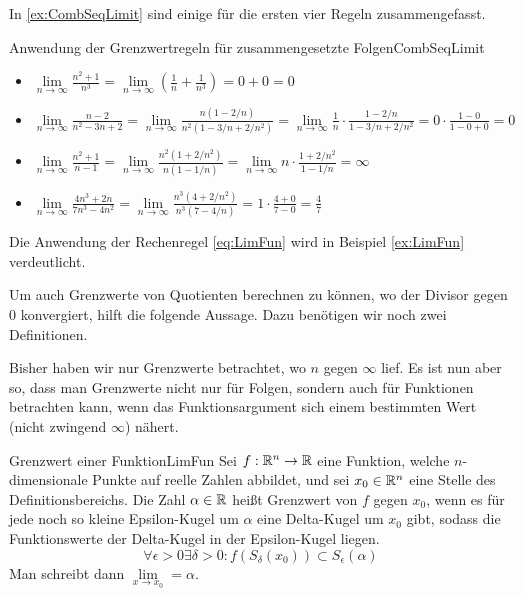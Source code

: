 In \ref{ex:CombSeqLimit} sind einige für die ersten vier Regeln zusammengefasst.

\begin{example}{Anwendung der Grenzwertregeln für zusammengesetzte Folgen}{CombSeqLimit}
    \begin{itemize}
        \item $\lim\limits_{n\to\infty} \frac{n^2+1}{n^3} = \lim\limits_{n\to\infty} \left(\frac{1}{n} + \frac{1}{n^3}\right) = 0 + 0 = 0$ \\
        \item $\lim\limits_{n\to\infty} \frac{n-2}{n^2-3n+2} = \lim\limits_{n\to\infty} \frac{n(1-2/n)}{n^2(1-3/n+2/n^2)} = \lim\limits_{n\to\infty} \frac{1}{n} \cdot \frac{1-2/n}{1-3/n+2/n^2} = 0 \cdot \frac{1-0}{1-0+0} = 0$ \\
        \item $\lim\limits_{n\to\infty} \frac{n^2+1}{n-1} = \lim\limits_{n\to\infty} \frac{n^2(1+2/n^2)}{n(1-1/n)} = \lim\limits_{n\to\infty} n \cdot \frac{1+2/n^2}{1-1/n} = \infty $
        \item $\lim\limits_{n\to\infty} \frac{4n^3+2n}{7n^3-4n^2} = \lim\limits_{n\to\infty} \frac{n^3(4+2/n^2)}{n^3(7-4/n)} = 1 \cdot \frac{4+0}{7-0} = \frac{4}{7}$
    \end{itemize}
\end{example}

Die Anwendung der Rechenregel \ref{eq:LimFun} wird in Beispiel \ref{ex:LimFun} verdeutlicht.

Um auch Grenzwerte von Quotienten berechnen zu können, wo der Divisor gegen $0$ konvergiert, hilft die folgende Aussage. Dazu benötigen wir noch zwei Definitionen.

Bisher haben wir nur Grenzwerte betrachtet, wo $n$ gegen $\infty$ lief. Es ist nun aber so, dass man Grenzwerte nicht nur für Folgen, sondern auch für Funktionen betrachten kann, wenn das Funktionsargument sich einem bestimmten Wert (nicht zwingend $\infty$) nähert.

\begin{definition}{Grenzwert einer Funktion}{LimFun}
    Sei $f: \mathbb{R}^n \to \mathbb{R}$ eine Funktion, welche $n$-dimensionale Punkte auf reelle Zahlen abbildet, und sei $x_0\in\mathbb{R}^n$ eine Stelle des Definitionsbereichs. Die Zahl $\alpha\in\mathbb{R}$ heißt Grenzwert von $f$ gegen $x_0$, wenn es für jede noch so kleine Epsilon-Kugel um $\alpha$ eine Delta-Kugel um $x_0$ gibt, sodass die Funktionswerte der Delta-Kugel in der Epsilon-Kugel liegen.
    $$
        \forall \epsilon > 0 \exists \delta > 0 : f(S_\delta(x_0)) \subset S_\epsilon(\alpha)
    $$
    Man schreibt dann $\lim\limits_{x\to x_0} = \alpha$.
\end{definition}

